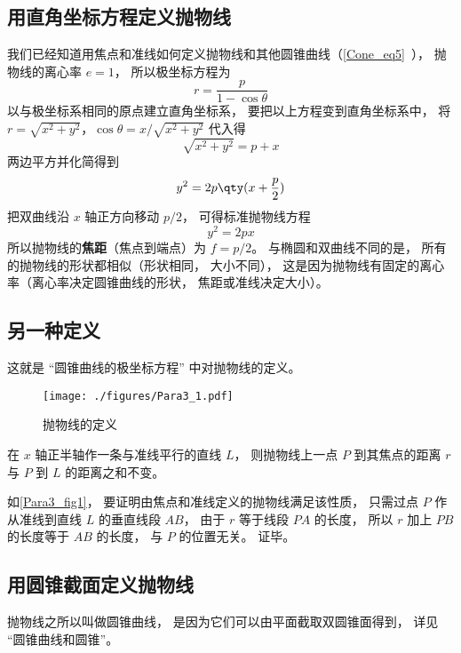 

\subsection{用直角坐标方程定义抛物线}
我们已经知道用焦点和准线如何定义抛物线和其他圆锥曲线（\autoref{Cone_eq5}~）， 抛物线的离心率 $e = 1$， 所以极坐标方程为
\begin{equation}\label{Para3_eq1}
r = \frac{p}{1 - \cos \theta }
\end{equation}
以与极坐标系相同的原点建立直角坐标系， 要把以上方程变到直角坐标系中， 将$r = \sqrt{x^2 + y^2}$，$\cos \theta  = x/\sqrt{x^2 + y^2}$ 代入得
\begin{equation}
\sqrt{x^2 + y^2}  = p + x
\end{equation}
两边平方并化简得到
\begin{equation}
y^2 = 2p \qty(x + \frac p2)
\end{equation}
把双曲线沿 $x$ 轴正方向移动 $p/2$， 可得标准抛物线方程
\begin{equation}\label{Para3_eq2}
y^2 = 2px
\end{equation}
所以抛物线的\textbf{焦距}（焦点到端点）为 $f = p/2$。 与椭圆和双曲线不同的是， 所有的抛物线的形状都相似（形状相同， 大小不同）， 这是因为抛物线有固定的离心率（离心率决定圆锥曲线的形状， 焦距或准线决定大小）。

\subsection{另一种定义}
这就是 “圆锥曲线的极坐标方程” 中对抛物线的定义。
\begin{figure}[ht]
\centering
\texttt{[image: ./figures/Para3\_1.pdf]}
\caption{抛物线的定义} \label{Para3_fig1}
\end{figure}

在 $x$ 轴正半轴作一条与准线平行的直线 $L$， 则抛物线上一点 $P$ 到其焦点的距离 $r$ 与 $P$ 到 $L$ 的距离之和不变。

如\autoref{Para3_fig1}， 要证明由焦点和准线定义的抛物线满足该性质， 只需过点 $P$ 作从准线到直线 $L$ 的垂直线段 $AB$， 由于 $r$ 等于线段 $PA$ 的长度， 所以 $r$ 加上 $PB$ 的长度等于 $AB$ 的长度， 与 $P$ 的位置无关。 证毕。

\subsection{用圆锥截面定义抛物线}
抛物线之所以叫做圆锥曲线， 是因为它们可以由平面截取双圆锥面得到， 详见 “圆锥曲线和圆锥”。

